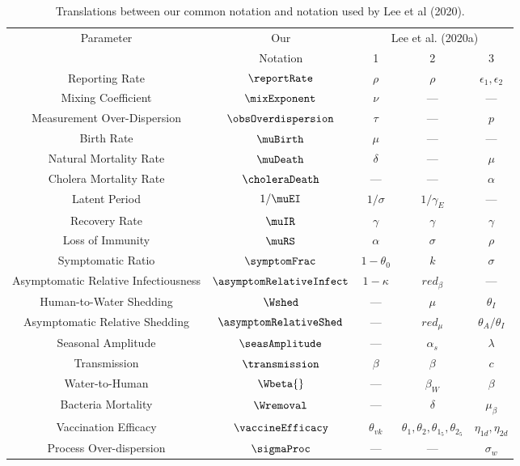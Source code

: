 \begin{table}
  \begin{center}
  \begin{tabular}{|c|c|c|c|c|}\hline
    \multirow{2}{*}{Parameter} & Our & \multicolumn{3}{c|}{Lee et al. (2020a)} \\\cline{3-5}
     & Notation & 1 & 2 & 3 \\
    \hline
    \hline
    Reporting Rate & $\reportRate$ & $\rho$ & $\rho$ & $\epsilon_1, \epsilon_2$ \\\hline
    Mixing Coefficient & $\mixExponent$ & $\nu$ & --- & --- \\\hline
    Measurement Over-Dispersion & $\obsOverdispersion$ & $\tau$ & --- & $p$ \\\hline
    Birth Rate & $\muBirth$ & $\mu$ & --- & --- \\\hline
    Natural Mortality Rate & $\muDeath$ & $\delta$ & --- & $\mu$ \\\hline
    Cholera Mortality Rate & $\choleraDeath$ & --- & --- & $\alpha$ \\\hline
    Latent Period & $1/\muEI$ & $1/\sigma$ & $1/\gamma_E$ & --- \\\hline
    Recovery Rate & $\muIR$ & $\gamma$ & $\gamma$ & $\gamma$ \\\hline
    Loss of Immunity & $\muRS$ & $\alpha$ & $\sigma$ & $\rho$ \\\hline
    Symptomatic Ratio & $\symptomFrac$ & $1 - \theta_0$ & $k$ & $\sigma$ \\\hline
    Asymptomatic Relative Infectiousness & $\asymptomRelativeInfect$ & $1-\kappa$ & $red_\beta$ & --- \\\hline
    Human-to-Water Shedding & $\Wshed$ & --- & $\mu$ & $\theta_I$ \\\hline
    Asymptomatic Relative Shedding & $\asymptomRelativeShed$ & --- & $red_\mu$ & $\theta_A/\theta_I$ \\\hline
    Seasonal Amplitude & $\seasAmplitude$ & --- & $\alpha_s$ & $\lambda$ \\\hline
    Transmission & $\transmission$ & $\beta$ & $\beta$ & $c$ \\\hline
    Water-to-Human & $\Wbeta{}$ & --- & $\beta_W$ & $\beta$ \\\hline
    Bacteria Mortality & $\Wremoval$ & --- & $\delta$ & $\mu_\beta$ \\\hline
    Vaccination Efficacy & $\vaccineEfficacy$ & $\theta_{vk}$ & $\theta_1, \theta_2, \theta_{1_5}, \theta_{2_5}$ & $\eta_{1d}, \eta_{2d}$ \\\hline
    Process Over-dispersion & $\sigmaProc$ & --- & --- & $\sigma_w$\\\hline
  \end{tabular}
  \end{center}
  \caption{\label{tab:translate}Translations between our common notation and notation used by Lee et al (2020).}
\end{table}

